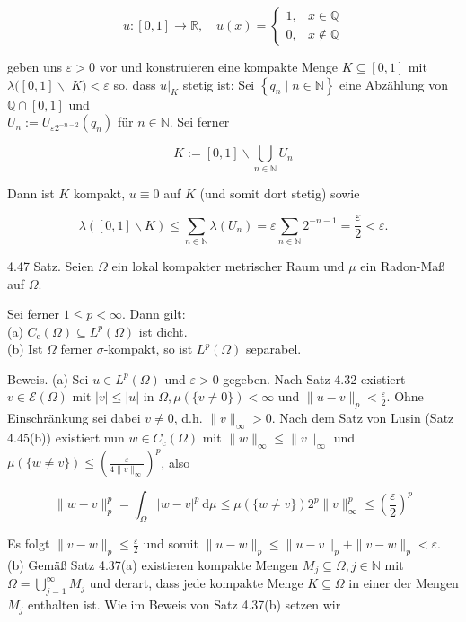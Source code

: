 \documentclass[10pt, letterpaper]{article}
\begin{document}
$$
u:[0,1] \rightarrow \mathbb{R}, \quad u(x)= \begin{cases}1, & x \in \mathbb{Q} \\ 0, & x \notin \mathbb{Q}\end{cases}
$$

geben uns $\varepsilon>0$ vor und konstruieren eine kompakte Menge $K \subseteq[0,1]$ mit $\lambda([0,1] \backslash$ $K)<\varepsilon$ so, dass $\left.u\right|_{K}$ stetig ist: Sei $\left\{q_{n} \mid n \in \mathbb{N}\right\}$ eine Abzählung von $\mathbb{Q} \cap[0,1]$ und\\
$U_{n}:=U_{\varepsilon 2^{-n-2}}\left(q_{n}\right)$ für $n \in \mathbb{N}$. Sei ferner

$$
K:=[0,1] \backslash \bigcup_{n \in \mathbb{N}} U_{n}
$$

Dann ist $K$ kompakt, $u \equiv 0$ auf $K$ (und somit dort stetig) sowie

$$
\lambda([0,1] \backslash K) \leq \sum_{n \in \mathbb{N}} \lambda\left(U_{n}\right)=\varepsilon \sum_{n \in \mathbb{N}} 2^{-n-1}=\frac{\varepsilon}{2}<\varepsilon .
$$

4.47 Satz. Seien $\Omega$ ein lokal kompakter metrischer Raum und $\mu$ ein Radon-Maß auf $\Omega$.

Sei ferner $1 \leq p<\infty$. Dann gilt:\\
(a) $C_{\mathrm{c}}(\Omega) \subseteq L^{p}(\Omega)$ ist dicht.\\
(b) Ist $\Omega$ ferner $\sigma$-kompakt, so ist $L^{p}(\Omega)$ separabel.

Beweis. (a) Sei $u \in L^{p}(\Omega)$ und $\varepsilon>0$ gegeben. Nach Satz 4.32 existiert $v \in \mathcal{E}(\Omega)$ mit $|v| \leq|u|$ in $\Omega, \mu(\{v \neq 0\})<\infty$ und $\|u-v\|_{p}<\frac{\varepsilon}{2}$. Ohne Einschränkung sei dabei $v \neq 0$, d.h. $\|v\|_{\infty}>0$. Nach dem Satz von Lusin (Satz 4.45(b)) existiert nun $w \in C_{\mathrm{c}}(\Omega)$ mit $\|w\|_{\infty} \leq\|v\|_{\infty}$ und $\mu(\{w \neq v\}) \leq\left(\frac{\varepsilon}{4\|v\|_{\infty}}\right)^{p}$, also

$$
\|w-v\|_{p}^{p}=\int_{\Omega}|w-v|^{p} \mathrm{~d} \mu \leq \mu(\{w \neq v\}) 2^{p}\|v\|_{\infty}^{p} \leq\left(\frac{\varepsilon}{2}\right)^{p}
$$

Es folgt $\|v-w\|_{p} \leq \frac{\varepsilon}{2}$ und somit $\|u-w\|_{p} \leq\|u-v\|_{p}+\|v-w\|_{p}<\varepsilon$.\\
(b) Gemäß Satz 4.37(a) existieren kompakte Mengen $M_{j} \subseteq \Omega, j \in \mathbb{N}$ mit $\Omega=\bigcup_{j=1}^{\infty} M_{j}$ und derart, dass jede kompakte Menge $K \subseteq \Omega$ in einer der Mengen $M_{j}$ enthalten ist. Wie im Beweis von Satz 4.37(b) setzen wir
\end{document}
